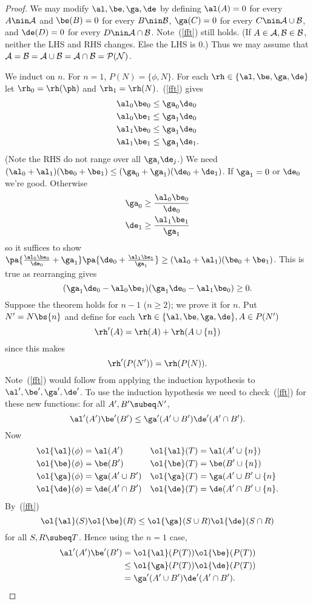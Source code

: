 \begin{proof}
We may modify $\al, \be, \ga, \de$ by defining $\al(A)=0$ for every $A\nin \cal A$ and $\be(B)=0$ for every $B\nin \cal B$, $\ga(C)=0$ for every $C\nin \cal A\cup \cal B$, and $\de(D)=0$ for every $D\nin \cal A\cap \cal B$. Note~(\ref{fft}) still holds. (If $A\in \cal A,B\in \cal B$, neither the LHS and RHS changes. Else the LHS is 0.) Thus we may assume that $\cal A=\cal B=\cal A\cup \cal B=\cal A\cap \cal B=P(N)$.

We induct on $n$. For $n=1$, $P(N)=\{\phi,N\}$. For each $\rh\in \{\al,\be,\ga,\de\}$ let $\rh_0=\rh(\ph)$ and $\rh_1=\rh(N)$.~(\ref{fft}) gives
\begin{align*}
\al_0\be_0&\le \ga_0\de_0\\
\al_0\be_1&\le \ga_1\de_0\\
\al_1\be_0&\le \ga_1\de_0\\
\al_1\be_1&\le \ga_1\de_1.
\end{align*}
(Note the RHS do not range over all $\ga_i\de_j$.)
We need $(\al_0+\al_1)(\be_0+\be_1)\le (\ga_0+\ga_1)(\de_0+\de_1)$. If $\ga_1=0$ or $\de_0$ we're good. Otherwise
\begin{align*}
\ga_0&\ge \frac{\al_0\be_0}{\de_0}\\
\de_1&\ge \frac{\al_1\be_1}{\ga_1}
\end{align*}
so it suffices to show $\pa{\frac{\al_0\be_0}{\de_0}+\ga_1}\pa{\de_0+\frac{\al_1\be_1}{\ga_1}}\ge (\al_0+\al_1)(\be_0+\be_1)$. This is true as rearranging gives
\[
(\ga_1\de_0-\al_0\be_1)(\ga_1\de_0-\al_1\be_0)\ge 0.
\]
Suppose the theorem holds for $n-1$ ($n\ge 2$); we prove it for $n$. Put $N'=N\bs \{n\}$ and define for each $\rh\in \{\al,\be,\ga,\de\}, A\in P(N')$
\[
\rh'(A)=\rh(A)+\rh(A\cup \{n\})\]
since this makes
\[
\rh'(P(N'))=\rh(P(N)).
\]
Note~(\ref{fft}) would follow from applying the induction hypothesis to $\al',\be',\ga',\de'$. To use the induction hypothesis we need to check~(\ref{fft}) for these new functions: for all $A',B'\subeq N'$,
\[
\al'(A')\be'(B')\le \ga'(A'\cup B')\de'(A'\cap B').
\]
Now
\begin{align*}
\ol{\al}(\phi)&=\al(A')&\ol{\al}(T)&=\al(A'\cup \{n\})\\
\ol{\be}(\phi)&=\be(B')& \ol{\be}(T)&=\be(B'\cup \{n\})\\
\ol{\ga}(\phi)&=\ga(A'\cup B')&\ol{\ga}(T)&=\ga(A'\cup B'\cup \{n\}\\
\ol{\de}(\phi)&=\de(A'\cap B')&\ol{\de}(T)&=\de(A'\cap B'\cup \{n\}.
\end{align*}
By~(\ref{fft})
\[
\ol{\al}(S)\ol{\be}(R)\le\ol{\ga}(S\cup R)\ol{\de}(S\cap R)
\]
for all $S,R\subeq T$. Hence using the $n=1$ case,
\begin{align*}
\al'(A')\be'(B')&=\ol{\al}(P(T))\ol{\be}(P(T))\\
&\le \ol{\ga}(P(T))\ol{\de}(P(T))\\
&=\ga'(A'\cup B')\de'(A'\cap B').
\end{align*}
\end{proof}
